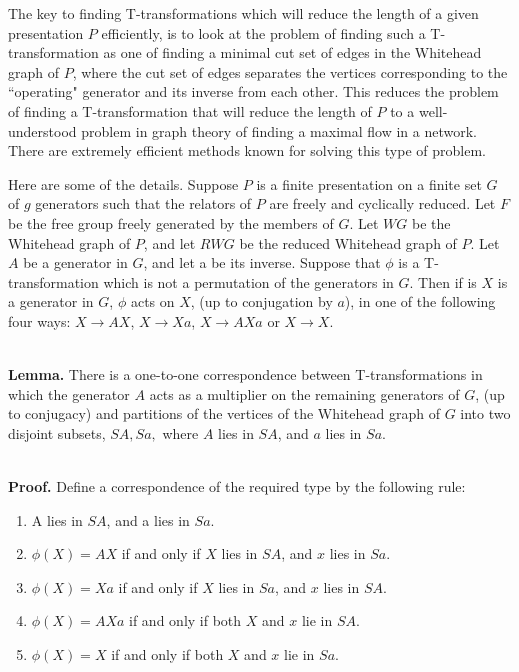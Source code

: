 \documentclass[12pt]{amsart}
\newcommand{\lemma}{\ \\ \noindent  \textbf{Lemma.} }
\newcommand{\pf}{\ \\ \noindent \textbf{Proof.} }
\begin{document}
                The key to finding T-transformations which will reduce the length of a given
        presentation $P$ efficiently, is to look at the problem of finding such a T-
        transformation as one of finding a minimal cut set of edges in the Whitehead graph of
        $P$, where the cut set of edges separates the vertices corresponding to the  ``operating"
        generator and its inverse from each other. This reduces the problem of finding a
        T-transformation that will reduce the length of $P$ to a well-understood problem
        in graph theory of finding a maximal flow in a network. There are extremely efficient
        methods known for solving this type of problem.
        
                Here are some of the details. Suppose $P$ is a finite presentation on a finite set $G$
        of $g$ generators such that the relators of $P$ are freely and cyclically reduced. Let $F$ be
        the free group freely generated by the members of $G$. Let $WG$ be the Whitehead graph of $P$,
        and let $RWG$ be the reduced Whitehead graph of $P$. Let $A$ be a generator in $G$, and let a be
        its inverse. Suppose that $\phi$ is a T-transformation which is not a permutation of the
        generators in $G$. Then if is $X$ is a generator in $G$, $\phi$ acts on $X$, (up to conjugation by $a$),
        in one of the following four ways: $X \to   AX$, $X \to  Xa$, $X \to AXa$ or $X \to X$.
        
        \lemma  There is a one-to-one correspondence between T-transformations in which the
        generator $A$ acts as a multiplier on the remaining generators of $G$, (up to conjugacy)
        and partitions of the vertices of the Whitehead graph of $G$ into two disjoint subsets,
        $SA,Sa,$ where $A$ lies in $SA$, and $a$ lies in $Sa$.
        
        \pf  Define a correspondence of the required type by the following rule:
        \begin{enumerate}
                \item      A lies in $SA$, and a lies in $Sa$.
                 \item $\phi(X) = AX$  if and only if $X$ lies in $SA$, and $x$ lies in $Sa$.
                \item      $\phi(X) = Xa$  if and only if $X$ lies in $Sa$, and $x$ lies in $SA$.
                \item      $\phi(X) = AXa$ if and only if both $X$ and $x$ lie in $SA$.
                \item      $\phi(X) = X$   if and only if both $X$ and $x$ lie in $Sa$.
              \end{enumerate}
\end{document}
